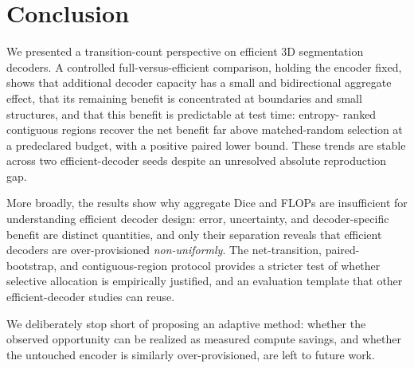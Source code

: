 \section{Conclusion}
\label{sec:conclusion}

We presented a transition-count perspective on efficient 3D segmentation
decoders.  A controlled full-versus-efficient comparison, holding the encoder
fixed, shows that additional decoder capacity has a small and bidirectional
aggregate effect, that its remaining benefit is concentrated at boundaries and
small structures, and that this benefit is predictable at test time: entropy-
ranked contiguous regions recover the net benefit far above matched-random
selection at a predeclared budget, with a positive paired lower bound.  These
trends are stable across two efficient-decoder seeds despite an unresolved
absolute reproduction gap.

More broadly, the results show why aggregate Dice and FLOPs are insufficient for
understanding efficient decoder design: error, uncertainty, and decoder-specific
benefit are distinct quantities, and only their separation reveals that efficient
decoders are over-provisioned \emph{non-uniformly}.  The net-transition,
paired-bootstrap, and contiguous-region protocol provides a stricter test of
whether selective allocation is empirically justified, and an evaluation template
that other efficient-decoder studies can reuse.

We deliberately stop short of proposing an adaptive method: whether the observed
opportunity can be realized as measured compute savings, and whether the untouched
encoder is similarly over-provisioned, are left to future work.

